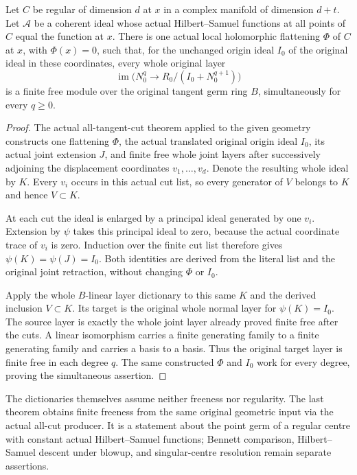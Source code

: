 \begin{theorem}
\label{hir:actual-original-centre-normal-layers-finite-free}
\leanok
Let $C$ be regular of dimension $d$ at $x$ in a complex manifold of
dimension $d+t$. Let $\mathcal A$ be a coherent ideal whose actual
Hilbert--Samuel functions at all points of $C$ equal the function at $x$.
There is one actual local holomorphic flattening $\Phi$ of $C$ at $x$,
with $\Phi(x)=0$, such that, for the unchanged origin ideal $I_0$
of the original ideal in these coordinates, every whole original layer
\[
 \operatorname{im}\bigl(N_0^q\to R_0/(I_0+N_0^{q+1})\bigr)
\]
is a finite free module over the original tangent germ ring $B$,
simultaneously for every $q\ge0$.
\end{theorem}
\begin{proof}
The actual all-tangent-cut theorem applied to the given geometry
constructs one flattening $\Phi$, the actual translated original origin
ideal $I_0$, its actual joint extension $J$, and finite free whole
joint layers after successively adjoining the displacement coordinates
$v_1,\ldots,v_d$. Denote the resulting whole ideal by $K$.
Every $v_i$ occurs in this actual cut list, so every generator of $V$
belongs to $K$ and hence $V\subset K$.

At each cut the ideal is enlarged by a principal ideal generated by
one $v_i$. Extension by $\psi$ takes this principal ideal to zero,
because the actual coordinate trace of $v_i$ is zero. Induction over
the finite cut list therefore gives $\psi(K)=\psi(J)=I_0$. Both
identities are derived from the literal list and the original joint
retraction, without changing $\Phi$ or $I_0$.

Apply the whole $B$-linear layer dictionary to this same $K$ and the
derived inclusion $V\subset K$. Its target is the original whole
normal layer for $\psi(K)=I_0$. The source layer is exactly the whole
joint layer already proved finite free after the cuts. A linear
isomorphism carries a finite generating family to a finite generating
family and carries a basis to a basis. Thus the original target layer
is finite free in each degree $q$. The same constructed $\Phi$ and
$I_0$ work for every degree, proving the simultaneous assertion.
\end{proof}

\begin{remark}
The dictionaries themselves assume neither freeness nor regularity.
The last theorem obtains finite freeness from the same original
geometric input via the actual all-cut producer. It is a statement
about the point germ of a regular centre with constant actual
Hilbert--Samuel functions; Bennett comparison, Hilbert--Samuel descent
under blowup, and singular-centre resolution remain separate assertions.
\end{remark}
